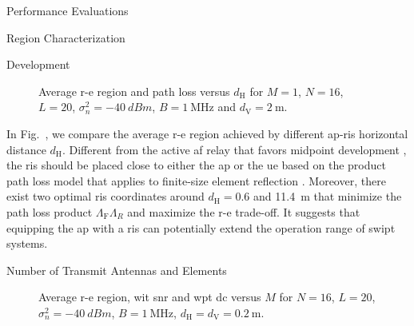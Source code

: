 \begin{section}{Performance Evaluations}
\begin{subsection}{ Region Characterization}
		\begin{subsubsection}{ Development}
			\begin{figure}[H]
				\centering
				\caption{Average \gls{r-e} region and path loss versus $d_{\mathrm{H}}$ for $M=1$, $N=16$, $L=20$, $\sigma_n^2=\qty{-40}{dBm}$, $B=\qty{1}{\MHz}$ and $d_{\mathrm{V}}=\qty{2}{\meter}$.}
			\end{figure}

			In Fig.~, we compare the average \gls{r-e} region achieved by different \gls{ap}-\gls{ris} horizontal distance $d_{\mathrm{H}}$. Different from the active \gls{af} relay that favors midpoint development \cite{Li2017}, the \gls{ris} should be placed close to either the \gls{ap} or the \gls{ue} based on the product path loss model that applies to finite-size element reflection \cite{Ozdogan2020,Tang2021}. Moreover, there exist two optimal \gls{ris} coordinates around $d_{\mathrm{H}}=0.6$ and \qty{11.4}{\meter} that minimize the path loss product $\Lambda_{\mathrm{F}}\Lambda_R$ and maximize the \gls{r-e} trade-off. It suggests that equipping the \gls{ap} with a \gls{ris} can potentially extend the operation range of \gls{swipt} systems.
		\end{subsubsection}

		\begin{subsubsection}{Number of Transmit Antennas and  Elements}
			\begin{figure}[H]
				\centering
				\caption{Average \gls{r-e} region, \gls{wit} \gls{snr} and \gls{wpt} \gls{dc} versus $M$ for $N=16$, $L=20$, $\sigma_n^2=\qty{-40}{dBm}$, $B=\qty{1}{\MHz}$, $d_{\mathrm{H}}=d_{\mathrm{V}}=\qty{0.2}{\meter}$.}
			\end{figure}


\end{subsubsection}
\end{subsection}
\end{section}
